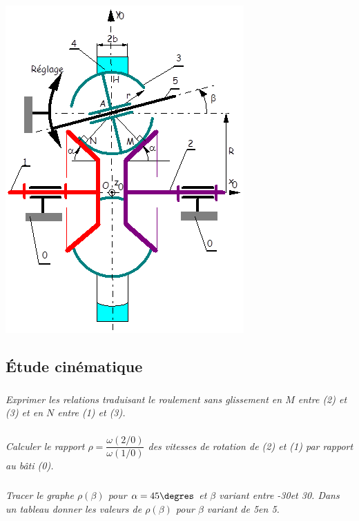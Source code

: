 \documentclass[10pt,fleqn]{article} %
\begin{document}
\begin{multicols}{2}
\begin{center}
\includegraphics[width=\linewidth]{images/fig_01}
\end{center}

\subsection*{Étude cinématique}

\subparagraph{}
\textit{Exprimer les relations traduisant le roulement sans glissement en $M$ entre (2) et (3) et en $N$ entre (1) et (3).}

\subparagraph{}
\textit{Calculer le rapport $\rho=\dfrac{\omega(2/0)}{\omega(1/0)}$ des vitesses de rotation de (2) et (1) par rapport au bâti (0).}

\subparagraph{}
\textit{Tracer le graphe $\rho(\beta)$ pour $\alpha =45\degres$ et $\beta$ variant entre -30\degres et 30\degres. Dans un tableau donner les valeurs de $\rho(\beta)$ pour $\beta$ variant de 5\degres  en 5\degres.}


\end{multicols}
\end{document}
